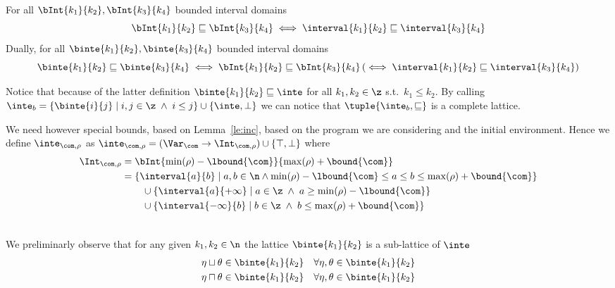 \begin{definition}
  For all \(\bInt{k_1}{k_2}, \bInt{k_3}{k_4}\) bounded interval
  domains
  \begin{equation*}
    \bInt{k_1}{k_2} \sqsubseteq \bInt{k_3}{k_4} \iff \interval{k_1}{k_2} \sqsubseteq \interval{k_3}{k_4}
  \end{equation*}
  \noindent
  Dually, for all \(\binte{k_1}{k_2}, \binte{k_3}{k_4}\) bounded
  interval domains
  \begin{equation*}
    \binte{k_1}{k_2} \sqsubseteq \binte{k_3}{k_4} \iff \bInt{k_1}{k_2} \sqsubseteq \bInt{k_3}{k_4}
    \left(\iff \interval{k_1}{k_2} \sqsubseteq \interval{k_3}{k_4} \right)
  \end{equation*}
\end{definition}

Notice that because of the latter definition
\(\binte{k_1}{k_2} \sqsubseteq \inte\) for all \(k_1, k_2 \in \z\)
s.t.\ \(k_1 \leq k_2\). By calling
\(\inte_b = \{\binte{i}{j} \mid i,j \in \z \; \land \; i \leq j\} \cup
\{\inte, \bot\}\) we can notice that \(\tuple{\inte_b, \sqsubseteq}\)
is a complete lattice.

\noindent
We need however special bounds, based on Lemma~\ref{le:inc}, based on
the program we are considering and the initial environment.  Hence we
define \(\inte_{\com,\rho}\) as
\({\inte_{\com,\rho} = (\Var_{\com} \to \Int_{\com,\rho}) \cup \{
  \top, \bot \}}\) where
\begin{align*}
  \Int_{\com,\rho} & = \bInt{\min(\rho)-\lbound{\com}}{\max(\rho) + \bound{\com}} \\
                   & = \{ \interval{a}{b} \mid a, b \in \n \land
                     \min(\rho) - \lbound{\com} \leq a \leq b \leq \max(\rho) + \bound{\com}\} \\
                   & \phantom{\veq} \cup \{\interval{a}{+\infty} \mid a \in\z \; \land \; a \geq \min(\rho) - \lbound{\com}\} \\
                   & \phantom{\veq} \cup \{\interval{-\infty}{b} \mid b \in\z \; \land \; b \leq \max(\rho) + \bound{\com}\} \\
                   & 
\end{align*}

We preliminarly observe that for any given \(k_1,k_2\in\n\) the
lattice \(\binte{k_1}{k_2}\) is a sub-lattice of \(\inte\)
\begin{align*}
  \eta \sqcup \theta & \in \binte{k_1}{k_2} & \forall \eta,\theta \in \binte{k_1}{k_2} \\
  \eta \sqcap \theta & \in \binte{k_1}{k_2} & \forall \eta,\theta \in \binte{k_1}{k_2}
\end{align*}

